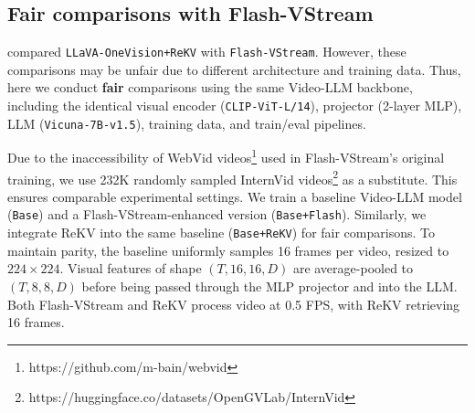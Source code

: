 

\subsection{Fair comparisons with Flash-VStream} \label{sec:fair_comparison}

 compared \texttt{LLaVA-OneVision+ReKV} with \texttt{Flash-VStream}. However, these comparisons may be unfair due to different architecture and training data. Thus, here we conduct \textbf{fair} comparisons using the same Video-LLM backbone, including the identical visual encoder (\texttt{CLIP-ViT-L/14}), projector (2-layer MLP), LLM (\texttt{Vicuna-7B-v1.5}), training data, and train/eval pipelines.

Due to the inaccessibility of WebVid videos\footnote{https://github.com/m-bain/webvid} used in Flash-VStream’s original training, we use 232K randomly sampled InternVid videos\footnote{https://huggingface.co/datasets/OpenGVLab/InternVid} as a substitute. This ensures comparable experimental settings.
We train a baseline Video-LLM model (\texttt{Base}) and a Flash-VStream-enhanced version (\texttt{Base+Flash}). Similarly, we integrate ReKV into the same baseline (\texttt{Base+ReKV}) for fair comparisons.
To maintain parity, the baseline uniformly samples 16 frames per video, resized to $224\times224$. Visual features of shape $(T, 16, 16, D)$ are average-pooled to $(T, 8, 8, D)$ before being passed through the MLP projector and into the LLM.
Both Flash-VStream and ReKV process video at 0.5 FPS, with ReKV retrieving 16 frames.

\begin{table}[h]
\centering
\caption{
\textbf{Fair comparisons with Flash-VStream.}
\textcolor{gray}{``Original Flash''} is the checkpoint officially published by Flash-VStream while ``Base+Flash'' is our reproduced version.
}
\label{tab:flash}
\vspace{-5pt}
\footnotesize
{}
\end{table}

